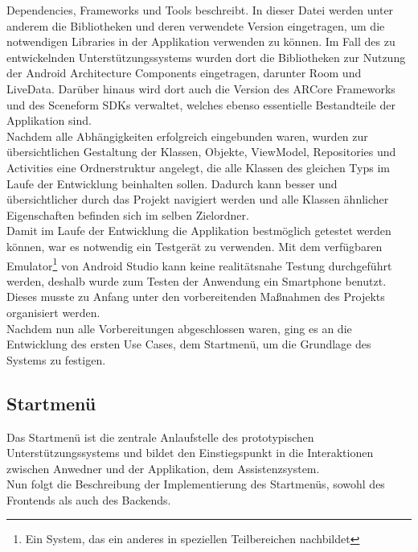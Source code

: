 Dependencies, Frameworks und Tools beschreibt. In dieser Datei werden unter 
anderem die Bibliotheken und deren verwendete Version eingetragen, um die notwendigen Libraries in der Applikation verwenden zu können. Im Fall des zu 
entwickelnden Unterstützungssystems wurden dort die Bibliotheken zur Nutzung der Android Architecture Components eingetragen, darunter Room und LiveData. 
Darüber hinaus wird dort auch die Version des ARCore Frameworks und des Sceneform \acs{SDK}s verwaltet, welches ebenso essentielle Bestandteile der 
Applikation sind.
\\ 
Nachdem alle Abhängigkeiten erfolgreich eingebunden waren, wurden zur übersichtlichen Gestaltung der Klassen, Objekte, ViewModel, Repositories und Activities 
eine Ordnerstruktur angelegt, die alle Klassen des gleichen Typs im Laufe der Entwicklung beinhalten sollen. Dadurch kann besser und übersichtlicher durch 
das Projekt navigiert werden und alle Klassen ähnlicher Eigenschaften befinden sich im selben Zielordner. 
\\ 
\linebreak
Damit im Laufe der Entwicklung die Applikation bestmöglich getestet werden können, war es notwendig ein Testgerät zu verwenden. Mit dem verfügbaren 
Emulator\footnote{Ein System, das ein anderes in speziellen Teilbereichen nachbildet} von Android Studio kann keine realitätsnahe Testung 
durchgeführt werden, deshalb wurde zum Testen der Anwendung ein Smartphone benutzt. Dieses musste zu Anfang unter den vorbereitenden Maßnahmen des 
Projekts organisiert werden.
\\ 
Nachdem nun alle Vorbereitungen abgeschlossen waren, ging es an die Entwicklung des ersten Use Cases, dem Startmenü, um die Grundlage des Systems zu festigen.  

\subsection{Startmenü}
Das Startmenü ist die zentrale Anlaufstelle des prototypischen Unterstützungssystems und bildet den Einstiegspunkt in die Interaktionen zwischen Anwedner 
und der Applikation, dem Assistenzsystem.
\\ 
Nun folgt die Beschreibung der Implementierung des Startmenüs, sowohl des Frontends als auch des Backends.

